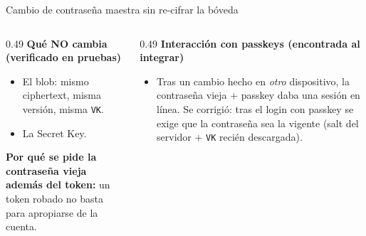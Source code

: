 \documentclass[aspectratio=169,10pt]{beamer}
\newcommand{\key}[1]{\textcolor{cripto}{\texttt{#1}}}
\begin{document}
\begin{frame}{Cambio de contraseña maestra sin re-cifrar la bóveda}
  \vspace{1mm}
  \begin{columns}[T]
    \begin{column}{0.49\textwidth}
      \scriptsize
      \textbf{Qué NO cambia (verificado en pruebas)}
      \begin{itemize}
        \item El blob: mismo ciphertext, misma versión, misma \key{VK}.
        \item La Secret Key.
      \end{itemize}
      \textbf{Por qué se pide la contraseña vieja además del token:} un token robado no basta
      para apropiarse de la cuenta.
    \end{column}
    \begin{column}{0.49\textwidth}
      \scriptsize
      \textbf{Interacción con passkeys (encontrada al integrar)}
      \begin{itemize}
        \item Tras un cambio hecho en \emph{otro} dispositivo, la contraseña vieja $+$ passkey
              daba una sesión en línea. Se corrigió: tras el login con passkey se exige que la
              contraseña sea la vigente (salt del servidor $+$ \key{VK} recién descargada).
      \end{itemize}
    \end{column}
  \end{columns}
\end{frame}
\end{document}
